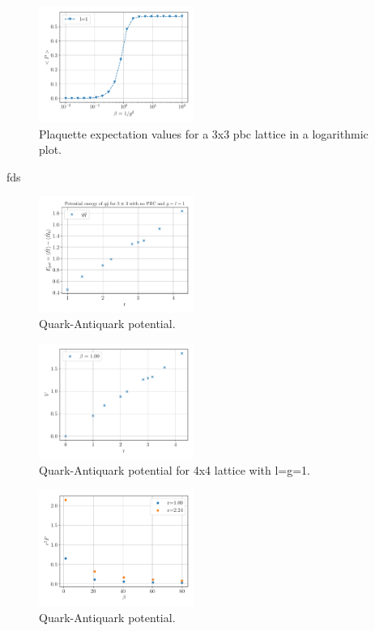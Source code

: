 \begin{figure}[h]
	\begin{center}
		\includegraphics[width=0.45\textwidth]{images/PlaquetteExp3x3PBCLog.pdf}
	\end{center}
	\caption{Plaquette expectation values for a 3x3 pbc lattice in a logarithmic plot.}
\end{figure}
\newpage
fds
\begin{figure}[h]
	\begin{center}
		\includegraphics[width=0.45\textwidth]{images/quark-antiquark-potential.pdf}
	\end{center}
	\caption{Quark-Antiquark potential.}
\end{figure}
\begin{figure}[h]
	\begin{center}
		\includegraphics[width=0.45\textwidth]{images/quark-antiquark-potential2.pdf}
	\end{center}
	\caption{Quark-Antiquark potential for 4x4 lattice with l=g=1.}
\end{figure}

\begin{figure}[h]
	\begin{center}
		\includegraphics[width=0.45\textwidth]{images/step_scaling.pdf}
	\end{center}
	\caption{Quark-Antiquark potential.}
\end{figure}
